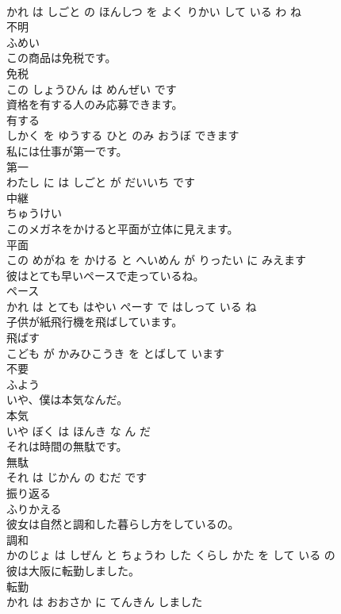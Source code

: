 \documentclass[8pt]{extreport}
\begin{document}
\begin{CJK}{UTF8}{min}
\\	かれ は しごと の ほんしつ を よく りかい して いる わ ね			
\\	不明	
\\	ふめい		
\\	この商品は免税です。	
\\	免税 
\\	この しょうひん は めんぜい です			
\\	資格を有する人のみ応募できます。	
\\	有する 
\\	しかく を ゆうする ひと のみ おうぼ できます			
\\	私には仕事が第一です。	
\\	第一 
\\	わたし に は しごと が だいいち です			
\\	中継	
\\	ちゅうけい		
\\	このメガネをかけると平面が立体に見えます。	
\\	平面 
\\	この めがね を かける と へいめん が りったい に みえます			
\\	彼はとても早いペースで走っているね。	
\\	ペース 
\\	かれ は とても はやい ぺーす で はしって いる ね			
\\	子供が紙飛行機を飛ばしています。	
\\	飛ばす 
\\	こども が かみひこうき を とばして います			
\\	不要	
\\	ふよう		
\\	いや、僕は本気なんだ。	
\\	本気 
\\	いや ぼく は ほんき な ん だ			
\\	それは時間の無駄です。	
\\	無駄 
\\	それ は じかん の むだ です			
\\	振り返る	
\\	ふりかえる		
\\	彼女は自然と調和した暮らし方をしているの。	
\\	調和 
\\	かのじょ は しぜん と ちょうわ した くらし かた を して いる の			
\\	彼は大阪に転勤しました。	
\\	転勤 
\\	かれ は おおさか に てんきん しました			

\end{CJK}
\end{document}
